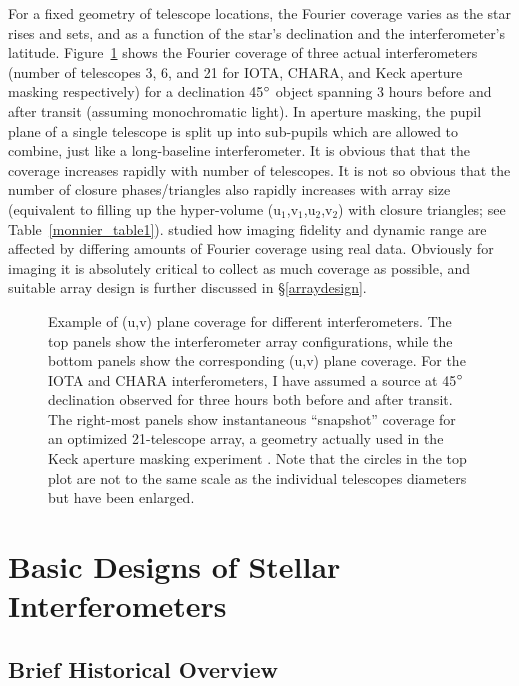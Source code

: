 \documentclass[12pt]{iopart}
\def\arcdegg{\hbox{$^\circ$}}
\begin{document}
For a fixed geometry of telescope locations, the Fourier coverage
varies as the star rises and sets, and as a function of the star's
declination and the interferometer's latitude.
Figure~\ref{figuvplane} shows the Fourier coverage of three actual
interferometers (number of telescopes 3, 6, and 21 for IOTA, CHARA,
and Keck aperture masking respectively) for a declination 45$\arcdegg$
object spanning 3 hours before and after transit (assuming
monochromatic light).  In aperture masking, the pupil plane of a
single telescope is split up into sub-pupils which are allowed to
combine, just like a long-baseline interferometer.  It is obvious that
that the coverage increases rapidly with number of telescopes.  It is
not so obvious that the number of closure phases/triangles also
rapidly increases with array size (equivalent to filling up the
hyper-volume (u$_1$,v$_1$,u$_2$,v$_2$) with closure triangles; see
Table~\ref{monnier_table1}). \citet{tuthillchara2000} studied how
imaging fidelity and dynamic range are affected by differing amounts
of Fourier coverage using real data.  Obviously for imaging it is
absolutely critical to collect as much coverage as possible, and
suitable array design is further discussed in \S\ref{arraydesign}.

\begin{figure}
\begin{center}
\caption{Example of (u,v) plane coverage for different
interferometers.  The top panels 
show the interferometer array configurations, while the bottom panels
show the corresponding (u,v) plane coverage.   For the IOTA and CHARA
interferometers, I have assumed a source at 
45$\arcdegg$ declination observed for three hours both 
before and after transit. The right-most panels show instantaneous
``snapshot'' coverage for an optimized 21-telescope array, a geometry
actually used in the Keck aperture masking experiment 
\citep{tuthill2000}.
Note that the circles in the top plot are not to the same scale as the
individual telescopes diameters but have been enlarged.
\label{figuvplane}}
\end{center}
\end{figure}

\section{Basic Designs of Stellar Interferometers}
\label{basicdesigns}
\subsection{Brief Historical Overview}
\label{history}
\end{document}
